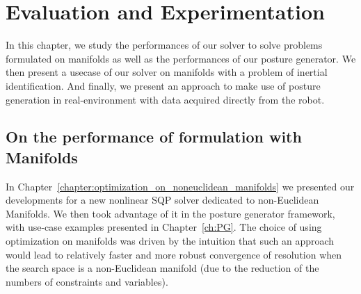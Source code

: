 

\chapter{Evaluation and Experimentation}
\label{cha:evaluation_and_experimentation}

\graphicspath{{Chapter6-Evaluation/Figs/}}

In this chapter, we study the performances of our solver to solve problems formulated on manifolds as well as the performances of our posture generator.
We then present a usecase of our solver on manifolds with a problem of inertial identification.
And finally, we present an approach to make use of posture generation in real-environment with data acquired directly from the robot.

\section{On the performance of formulation with Manifolds}
\label{sec:On_the_performance_of_formulation_with_manifolds}

In Chapter~\ref{chapter:optimization_on_noneuclidean_manifolds} we presented our developments for a new nonlinear SQP solver dedicated to non-Euclidean Manifolds.
We then took advantage of it in the posture generator framework, with use-case examples presented in Chapter~\ref{ch:PG}.
The choice of using optimization on manifolds was driven by the intuition that such an approach would lead to relatively faster and more robust convergence of resolution when the search space is a non-Euclidean manifold (due to the reduction of the numbers of constraints and variables).

